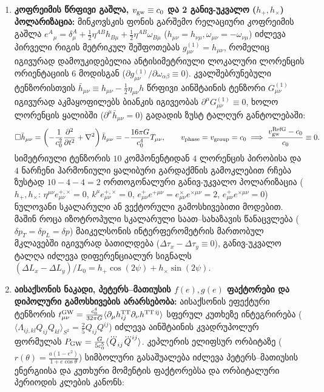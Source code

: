 \documentclass[11pt,a4paper]{article}
\begin{document}
\begin{enumerate}[label=\arabic*.]
\item \textbf{კოფრეიმის წრფივი გაშლა, $v_{\rm gw} \equiv c_0$ და 2 განივ-უკვალო ($h_+, h_\times$) პოლარიზაცია:} მინკოვსკის ფონის გარშემო რელაციური კოფრეიმის გაშლა $e^A{}_\mu = \delta^A_\mu + \frac{1}{2}\eta^{AB}h_{B\mu} + \frac{1}{2}\eta^{AB}\omega_{B\mu}$ ($h_{\mu\nu} = h_{\nu\mu}, \omega_{\mu\nu} = -\omega_{\nu\mu}$) იძლევა პირველი რიგის მეტრიკულ შეშფოთებას $g^{(1)}_{\mu\nu} = h_{\mu\nu}$, რომელიც იგივურად დამოუკიდებელია ანტისიმეტრიული ლოკალური ლორენცის ორიენტაციის 6 მოდისგან ($\partial g^{(1)}_{\mu\nu}/\partial\omega_{\alpha\beta} \equiv 0$). კვალშებრუნებული ტენზორისთვის $\bar{h}_{\mu\nu} \equiv h_{\mu\nu} - \frac{1}{2}\eta_{\mu\nu}h$ წრფივი აინშტაინის ტენზორი $G^{(1)}_{\mu\nu}$ იგივურად აკმაყოფილებს ბიანკის იგივეობას $\partial^\mu G^{(1)}_{\mu\nu} \equiv 0$, ხოლო ლორენცის ყალიბში ($\partial^\mu\bar{h}_{\mu\nu} = 0$) გადადის ზუსტ ტალღურ განტოლებაში:
\[
   \Box\bar{h}_{\mu\nu} = \left(-\frac{1}{c_0^2}\frac{\partial^2}{\partial t^2} + \nabla^2\right)\bar{h}_{\mu\nu} = -\frac{16\pi G}{c_0^4}T_{\mu\nu}, \qquad v_{\rm phase} = v_{\rm group} = c_0 \implies \frac{v_{\rm gw}^{\rm RefG} - c_0}{c_0} \equiv 0.
\]
სიმეტრიული ტენზორის $10$ კომპონენტიდან $4$ ლორენცის პირობისა და $4$ ნარჩენი ჰარმონიული ყალიბური გარდაქმნის გამოკლებით რჩება ზუსტად \textbf{$10 - 4 - 4 = 2$} ორთოგონალური განივ-უკვალო პოლარიზაცია ($h_+, h_\times$: $\eta^{\mu\nu}e^{+,\times}_{\mu\nu} = 0$, $k^\mu e^{+,\times}_{\mu\nu} = 0$, $e^+_{\mu\nu}e^{+\mu\nu} = e^\times_{\mu\nu}e^{\times\mu\nu} = 2$, $e^+_{\mu\nu}e^{\times\mu\nu} = 0$) ნულოვანი სკალარული ან ვექტორული გამოსხივებითი მოდებით. მაშინ როცა იზოტროპული სკალარული საათ–სახაზავის წანაცვლება ($\delta p_T = \delta p_L = \delta p$) მაიკელსონის ინტერფერომეტრის მართობულ მკლავებში იგივურად ბათილდება ($\Delta\tau_x - \Delta\tau_y \equiv 0$), განივ-უკვალო ტალღა იძლევა დიფერენციალურ სიგნალს $(\Delta L_x - \Delta L_y)/L_0 = h_+\cos(2\psi) + h_\times\sin(2\psi)$.
\item \textbf{აისაქსონის ნაკადი, პეტერს–მათიუსის $f(e), g(e)$ ფაქტორები და დიპოლური გამოსხივების არარსებობა:} აისაქსონის ეფექტური ტენზორის $t^{\rm GW}_{\mu\nu} = \frac{c_0^4}{32\pi G}\langle\partial_\mu h^{\rm TT}_{ij}\partial_\nu h^{\rm TT\,ij}\rangle$ სფერულ კუთხეზე ინტეგრირება ($\langle\Lambda_{ij,kl}Q_{ij}Q_{kl}\rangle_{S^2} = \frac{2}{5}Q_{ij}Q^{ij}$) იძლევა აინშტაინის კვადრუპოლურ ფორმულას $P_{\rm GW} = \frac{G}{5 c_0^5}\langle\dddot{Q}_{ij}\dddot{Q}^{ij}\rangle$. კეპლერის ელიფსურ ორბიტაზე ($r(\theta) = \frac{a(1-e^2)}{1+e\cos\theta}$) სიმბოლური გასაშუალება იძლევა პეტერს–მათიუსის ენერგიისა და კუთხური მომენტის ფაქტორებსა და ორბიტალური პერიოდის კლების კანონს:

\end{enumerate}
\end{document}
